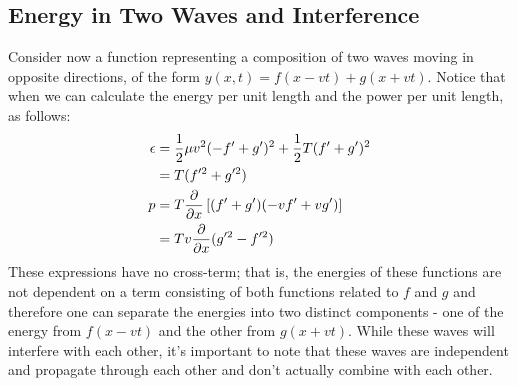 \subsection{Energy in Two Waves and Interference} 
Consider now a function representing a composition of two waves moving in opposite directions, of the form $y(x, t) = f(x-vt) + g(x+vt)$. Notice that when we can calculate the energy per unit length and the power per unit length, as follows: 
\begin{align*}
	\epsilon &= \frac{1}{2} \mu v^2 (-f' + g')^2 + \frac{1}{2} T (f' + g')^2 \\
	&= T (f'^2 + g'^2)\\
	p &= T \frac{\partial }{\partial x} \left[(f' + g') (-v f' + v g') \right] \\
	&= Tv \frac{\partial }{\partial x} (g'^2 - f'^2)
\end{align*}
These expressions have no cross-term; that is, the energies of these functions are not dependent on a term consisting of both functions related to $f$ and $g$ and therefore one can separate the energies into two distinct components - one of the energy from $f(x-vt)$ and the other from $g(x+vt)$. While these waves will interfere with each other, it's important to note that these waves are independent and propagate through each other and don't actually combine with each other. 
